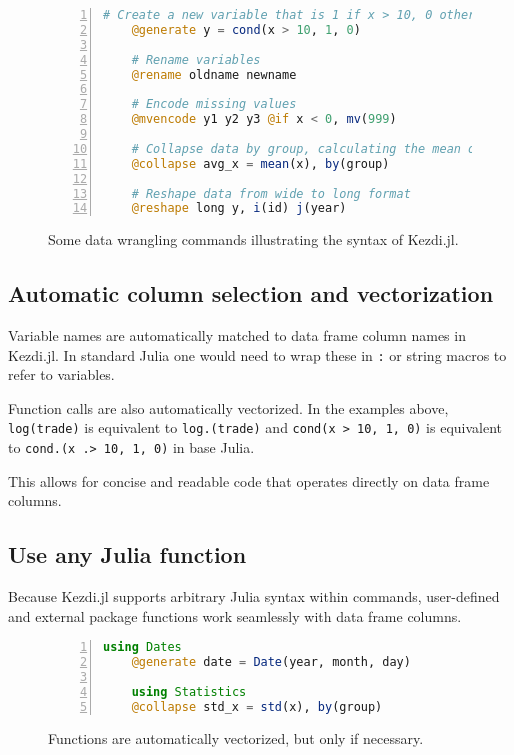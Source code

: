 \documentclass{juliacon}
\begin{document}
\begin{figure}[t]
	\begin{lstlisting}[language = Julia, numbers=left, numberstyle=\tiny\color{gray}]
	# Create a new variable that is 1 if x > 10, 0 otherwise
	@generate y = cond(x > 10, 1, 0)
	
	# Rename variables
	@rename oldname newname
	
	# Encode missing values
	@mvencode y1 y2 y3 @if x < 0, mv(999)
	
	# Collapse data by group, calculating the mean of x
	@collapse avg_x = mean(x), by(group)
	
	# Reshape data from wide to long format
	@reshape long y, i(id) j(year)
	\end{lstlisting}
	
\caption{Some data wrangling commands illustrating the syntax of Kezdi.jl.}
\label{fig:syntax}
\end{figure}

\subsection{Automatic column selection and vectorization}

Variable names are automatically matched to data frame column names in Kezdi.jl. In standard Julia one would need to wrap these in \texttt{:} or string macros to refer to variables.

Function calls are also automatically vectorized. In the examples above, \texttt{log(trade)} is equivalent to \texttt{log.(trade)} and \texttt{cond(x > 10, 1, 0)} is equivalent to \texttt{cond.(x .> 10, 1, 0)} in base Julia.

This allows for concise and readable code that operates directly on data frame columns.

\subsection{Use any Julia function}

Because Kezdi.jl supports arbitrary Julia syntax within commands, user-defined and external package functions work seamlessly with data frame columns.

\begin{figure}[t]
	\begin{lstlisting}[language = Julia, numbers=left, numberstyle=\tiny\color{gray}]
	using Dates
	@generate date = Date(year, month, day)
	
	using Statistics
	@collapse std_x = std(x), by(group) 
	\end{lstlisting}
	
\caption{Functions are automatically vectorized, but only if necessary.}
\label{fig:vectorization}
\end{figure}
\end{document}
